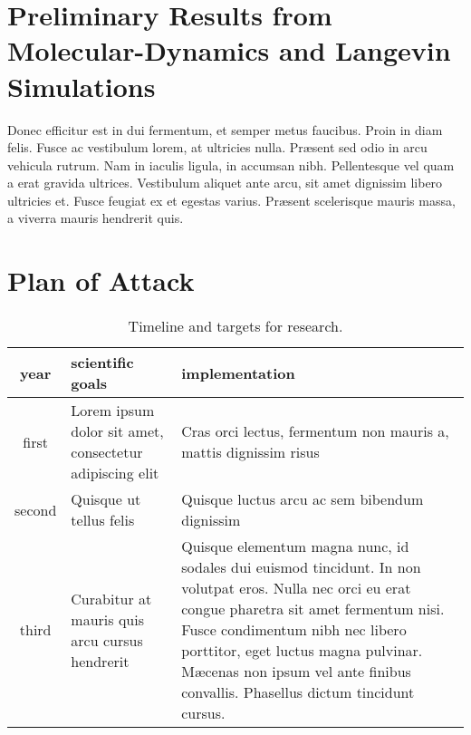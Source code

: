 \documentclass[12pt]{article}
\begin{document}
\section{Preliminary Results from Molecular-Dynamics and Langevin Simulations}
%

Donec efficitur est in dui fermentum, et semper metus faucibus. Proin in diam felis. Fusce ac vestibulum lorem, at ultricies nulla. Pr{\ae}sent sed odio in arcu vehicula rutrum. Nam in iaculis ligula, in accumsan nibh. Pellentesque vel quam a erat gravida ultrices. Vestibulum aliquet ante arcu, sit amet dignissim libero ultricies et. Fusce feugiat ex et egestas varius. Pr{\ae}sent scelerisque mauris massa, a viverra mauris hendrerit quis.



\section{Plan of Attack}


\begin{table}
\begin{center}
\caption{%
Timeline and targets for research.
}
\renewcommand{\arraystretch}{1.1}%
\tabcolsep
\begin{tabular}{|c|p{0.39\hsize}|p{0.39\hsize}|}
\hline
year &\hfil scientific goals\hfil&\hfil implementation\hfil\\
\hline
first &
Lorem ipsum dolor sit amet, consectetur adipiscing elit &
Cras orci lectus, fermentum non mauris a, mattis dignissim risus \\
\hline
second &
Quisque ut tellus felis &
Quisque luctus arcu ac sem bibendum dignissim \\
\hline
third &
Curabitur at mauris quis arcu cursus hendrerit &
Quisque elementum magna nunc, id sodales dui euismod tincidunt. In non volutpat eros. Nulla nec orci eu erat congue pharetra sit amet fermentum nisi. Fusce condimentum nibh nec libero porttitor, eget luctus magna pulvinar. M{\ae}cenas non ipsum vel ante finibus convallis. Phasellus dictum tincidunt cursus.\\
\hline
\end{tabular}
\end{center}
\end{table}
\end{document}
